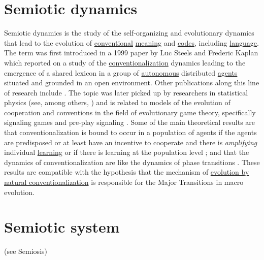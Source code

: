 \documentclass[12pt]{article}
\begin{document}
\section{Semiotic dynamics}

Semiotic dynamics is the study of the self-organizing and evolutionary
dynamics that lead to the evolution of
\hyperlink{convention}{conventional} \hyperlink{meaning}{meaning} and \hyperlink{code}{codes}, including
\hyperlink{language}{language}. The term was first introduced in a
1999 paper by Luc Steels and Frederic Kaplan \cite{steels99ecal} which
reported on a study of the
\hyperlink{conventionalization}{conventionalization} dynamics leading
to the emergence of a shared lexicon in a group of \hyperlink{autonomy}{autonomous}
distributed \hyperlink{agent}{agents} situated and grounded in an open environment. Other
publications along this line of research include
\cite{DeBeule06Cross_Situational_learning,vylder06namingGameConvergenceJTB,devylder07:phd,wellens08:_flexib_word_meanin_in_embod_agent}. The
topic was later picked up by researchers in statistical physics (see,
among others,
\cite{baronchelli05sharpTransitionVocabulary,cattuto07:_semiot_dynam_and_collab_taggin,puglisi08culturalRoutePNAS,loreto12})
and is related to models of the evolution of cooperation and
conventions in the field of evolutionary game theory, specifically
signaling games and pre-play signaling
\cite{skyrms10:_signal_evolut_learn_infor,santos11:_co}. Some of the
main theoretical results are that conventionalization is bound to
occur in a population of agents if the agents are predisposed or at
least have an incentive to cooperate and there is {\em amplifying}
individual \hyperlink{learning}{learning}
\cite{vylder06namingGameConvergenceJTB,skyrms10:_signal_evolut_learn_infor}
or if there is learning at the population level
\cite{santos11:_co,beule12:_overc_traged_commun_hawk_dove_conven_codin};
and that the dynamics of conventionalization are like the dynamics of
phase transitions \cite{baronchelli05sharpTransitionVocabulary}. These
results are compatible with the hypothesis that the mechanism of
\hyperlink{natural_conventionalization}{ evolution by natural
  conventionalization} is responsible for the Major Transitions in macro evolution.


\hypertarget{semiotic_system}{}
\section{Semiotic system} (see Semiosis)


\hypertarget{sequences}{}
\end{document}
